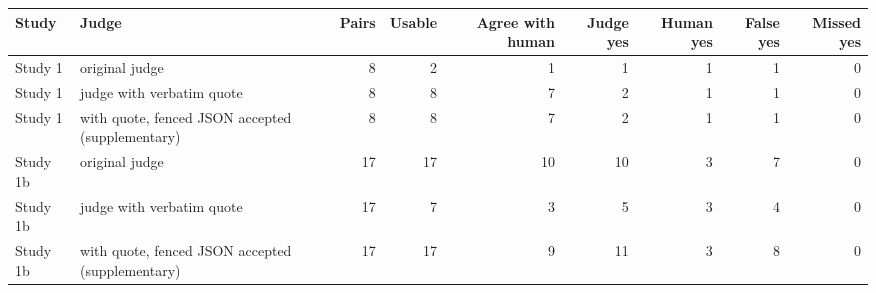 \begin{tabular}{llrrrrrrr}
\toprule
Study & Judge & Pairs & Usable & Agree with human & Judge yes & Human yes & False yes & Missed yes \\
\midrule
Study 1 & original judge & 8 & 2 & 1 & 1 & 1 & 1 & 0 \\
Study 1 & judge with verbatim quote & 8 & 8 & 7 & 2 & 1 & 1 & 0 \\
Study 1 & with quote, fenced JSON accepted (supplementary) & 8 & 8 & 7 & 2 & 1 & 1 & 0 \\
Study 1b & original judge & 17 & 17 & 10 & 10 & 3 & 7 & 0 \\
Study 1b & judge with verbatim quote & 17 & 7 & 3 & 5 & 3 & 4 & 0 \\
Study 1b & with quote, fenced JSON accepted (supplementary) & 17 & 17 & 9 & 11 & 3 & 8 & 0 \\
\bottomrule
\end{tabular}
